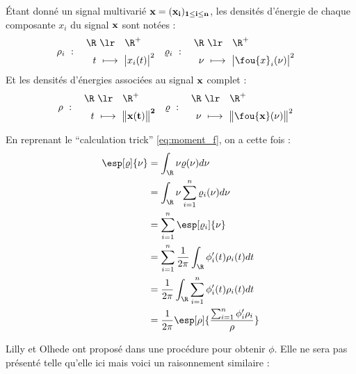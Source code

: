 \begin{definition}\label{def:densi_dE-mv}
	Étant donné un signal multivarié $\bf{x}=(x_i)_{1\leq i\leq n}$, les densités d'énergie de chaque composante $x_i$ du signal $\bf{x}$ sont notées :
	\begin{align}\label{eq:densi_dEi}
		\rho_i\ &:\quad \begin{aligned}\R\ &\lr\quad \R^+ \\ t\ &\longmapsto\ \big|x_i(t)\big|^2 \end{aligned}  
		&
		\varrho_i\ &:\quad \begin{aligned}\R\ &\lr\quad \R^+ \\ \nu\ &\longmapsto\ \big|\fou{x}_i(\nu)\big|^2 \end{aligned}
	\end{align}
	Et les densités d'énergies associées au signal $\bf{x}$ complet :
	\begin{align}\label{eq:densi_dE-mv}
		\rho\ &:\quad \begin{aligned}\R\ &\lr\quad \R^+ \\ t\ &\longmapsto\ \big\|\bf{x}(t)\big\|^2 \end{aligned}  
		&
		\varrho\ &:\quad \begin{aligned}\R\ &\lr\quad \R^+ \\ \nu\ &\longmapsto\ \big\|\fou{\bf{x}}(\nu)\big\|^2 \end{aligned}	
	\end{align}
\end{definition}

En reprenant le ``calculation trick'' \eqref{eq:moment_f}, on a cette fois :
\begin{align*}
	\esp[\varrho]{\nu} &= \int_\R \nu\varrho(\nu)d\nu \\
		 &= \int_\R \nu\sum_{i=1}^n \varrho_i(\nu) d\nu \\
		 &= \sum_{i=1}^n\esp[\varrho_i]{\nu} \\
		 &= \sum_{i=1}^n\frac{1}{2\pi}\int_\R \phi_i'(t)\rho_i(t)dt \\
		 &= \frac{1}{2\pi}\int_\R \sum_{i=1}^n\phi_i'(t)\rho_i(t)dt \\
		 &= \frac{1}{2\pi} \esp[\rho]{\frac{\sum_{i=1}^n \phi_i'\rho_i}{\rho}}
\end{align*}





\newpage
Lilly et Olhede ont proposé dans \cite{lilly_analysis_2012} une procédure pour obtenir $\phi$. Elle ne sera pas présenté telle qu'elle ici mais voici un raisonnement similaire :
\\


